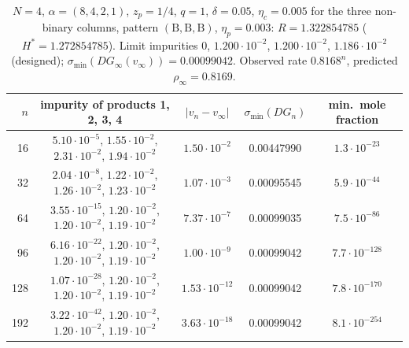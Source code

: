 \documentclass[11pt,a4paper]{report}
\newcommand{\Hs}{H^{*}}
\newcommand{\Bs}{\mathrm B}
\begin{document}
\begin{table}[t]
\centering\footnotesize\setlength{\tabcolsep}{4pt}
\caption{\(N=4\), \(\alpha=(8,4,2,1)\), \(z_p=1/4\), \(q=1\), \(\delta=0.05\), \(\eta_c=0.005\) for the three non-binary columns, pattern
\((\Bs,\Bs,\Bs)\), \(\eta_p=0.003\): \(R=1.322854785\) (\(\Hs=1.272854785\)). Limit impurities \(0\), \(1.200\cdot10^{-2}\),
\(1.200\cdot10^{-2}\), \(1.186\cdot10^{-2}\) (designed); \(\sigma_{\min}(DG_\infty(v_\infty))=0.00099042\). Observed rate \(0.8168^n\),
predicted \(\rho_\infty=0.8169\).}\label{tab:n4}
\begin{tabular}{@{}rcccc@{}}
\toprule
\(n\) & impurity of products 1, 2, 3, 4 & \(|v_n-v_\infty|\) & \(\sigma_{\min}(DG_n)\) & min.\ mole fraction\\
\midrule
16 & \(5.10\cdot10^{-5}\), \(1.55\cdot10^{-2}\), \(2.31\cdot10^{-2}\), \(1.94\cdot10^{-2}\) & \(1.50\cdot10^{-2}\) & 0.00447990 & \(1.3\cdot10^{-23}\)\\
32 & \(2.04\cdot10^{-8}\), \(1.22\cdot10^{-2}\), \(1.26\cdot10^{-2}\), \(1.23\cdot10^{-2}\) & \(1.07\cdot10^{-3}\) & 0.00095545 & \(5.9\cdot10^{-44}\)\\
64 & \(3.55\cdot10^{-15}\), \(1.20\cdot10^{-2}\), \(1.20\cdot10^{-2}\), \(1.19\cdot10^{-2}\) & \(7.37\cdot10^{-7}\) & 0.00099035 & \(7.5\cdot10^{-86}\)\\
96 & \(6.16\cdot10^{-22}\), \(1.20\cdot10^{-2}\), \(1.20\cdot10^{-2}\), \(1.19\cdot10^{-2}\) & \(1.00\cdot10^{-9}\) & 0.00099042 & \(7.7\cdot10^{-128}\)\\
128 & \(1.07\cdot10^{-28}\), \(1.20\cdot10^{-2}\), \(1.20\cdot10^{-2}\), \(1.19\cdot10^{-2}\) & \(1.53\cdot10^{-12}\) & 0.00099042 & \(7.8\cdot10^{-170}\)\\
192 & \(3.22\cdot10^{-42}\), \(1.20\cdot10^{-2}\), \(1.20\cdot10^{-2}\), \(1.19\cdot10^{-2}\) & \(3.63\cdot10^{-18}\) & 0.00099042 & \(8.1\cdot10^{-254}\)\\
\bottomrule
\end{tabular}
\end{table}
\end{document}
